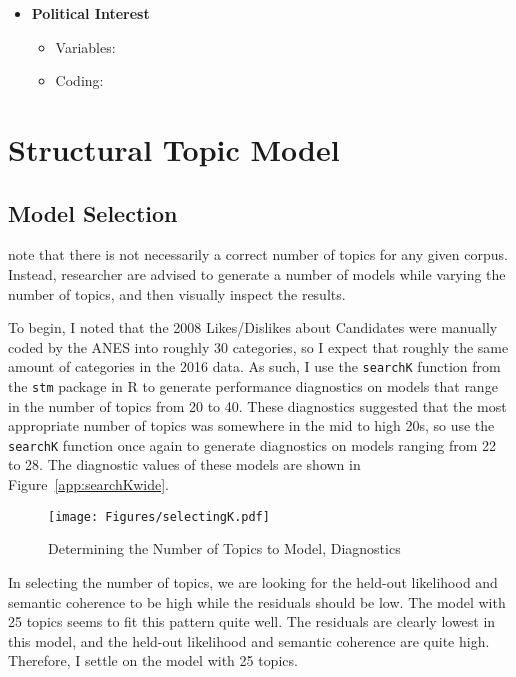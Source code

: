 \documentclass[12pt]{article}
\begin{document}
\begin{appendices}
\begin{refsection}
\begin{itemize}
		\item \textbf{Political Interest}
	\begin{itemize}
		\item Variables:
		\item Coding:
	\end{itemize}
	
\end{itemize}		



\doublespacing
\clearpage







\section{Structural Topic Model}\label{app:stm}

\subsection{Model Selection}\label{app:modelselection}
\textcite{roberts2014structural} note that there is not necessarily a correct number of topics for any given corpus. Instead, researcher are advised to generate a number of models while varying the number of topics, and then visually inspect the results. 

To begin, I noted that the 2008 Likes/Dislikes about Candidates were manually coded by the ANES into roughly 30 categories, so I expect that roughly the same amount of categories in the 2016 data. As such, I use the \texttt{searchK} function from the \texttt{stm} package in R to generate performance diagnostics on models that range in the number of topics from 20 to 40. These diagnostics suggested that the most appropriate number of topics was somewhere in the mid to high 20s, so use the \texttt{searchK} function once again to generate diagnostics on models ranging from 22 to 28. The diagnostic values of these models are shown in Figure~\ref{app:searchKwide}. 

\begin{figure}[h!]
	\centering
	\texttt{[image: Figures/selectingK.pdf]}
	\caption{Determining the Number of Topics to Model, Diagnostics}\label{fig:searchKwide}
\end{figure}

In selecting the number of topics, we are looking for the held-out likelihood and semantic coherence to be high while the residuals should be low. The model with 25 topics seems to fit this pattern quite well. The residuals are clearly lowest in this model, and the held-out likelihood and semantic coherence are quite high. Therefore, I settle on the model with 25 topics. 


\end{refsection}
\end{appendices}
\end{document}
